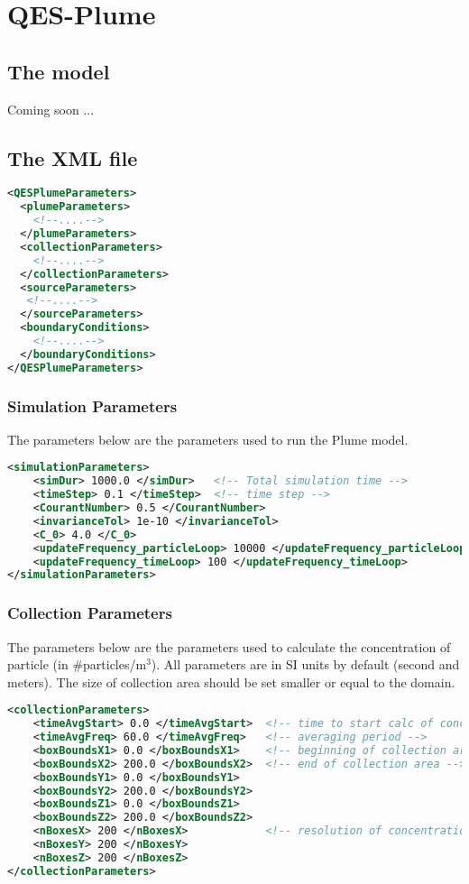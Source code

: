 \chapter{QES-Plume}

\section{The model}

Coming soon ...

\section{The XML file}

\begin{lstlisting}[language=XML]
<QESPlumeParameters>
  <plumeParameters>
    <!--....-->
  </plumeParameters>
  <collectionParameters>
    <!--....-->
  </collectionParameters>
  <sourceParameters>
   <!--....-->
  </sourceParameters>
  <boundaryConditions>
    <!--....-->
  </boundaryConditions>
</QESPlumeParameters>
\end{lstlisting}

\subsection{Simulation Parameters}

The parameters below are the parameters used to run the Plume model.

\begin{lstlisting}[language=XML]
<simulationParameters>
    <simDur> 1000.0 </simDur>   <!-- Total simulation time -->
    <timeStep> 0.1 </timeStep>  <!-- time step -->
    <CourantNumber> 0.5 </CourantNumber>
    <invarianceTol> 1e-10 </invarianceTol>
    <C_0> 4.0 </C_0>
    <updateFrequency_particleLoop> 10000 </updateFrequency_particleLoop>
    <updateFrequency_timeLoop> 100 </updateFrequency_timeLoop>
</simulationParameters>
\end{lstlisting}

\subsection{Collection Parameters}

The parameters below are the parameters used to calculate the concentration of particle (in \#particles/m$^{3}$). All parameters are in SI units by default (second and meters). The size of collection area should be set smaller or equal to the domain.
\begin{lstlisting}[language=XML]
<collectionParameters>
    <timeAvgStart> 0.0 </timeAvgStart>  <!-- time to start calc of concentration -->
    <timeAvgFreq> 60.0 </timeAvgFreq>   <!-- averaging period -->
    <boxBoundsX1> 0.0 </boxBoundsX1>    <!-- beginning of collection area -->
    <boxBoundsX2> 200.0 </boxBoundsX2>  <!-- end of collection area -->
    <boxBoundsY1> 0.0 </boxBoundsY1>
    <boxBoundsY2> 200.0 </boxBoundsY2>
    <boxBoundsZ1> 0.0 </boxBoundsZ1>
    <boxBoundsZ2> 200.0 </boxBoundsZ2>
    <nBoxesX> 200 </nBoxesX>            <!-- resolution of concentration -->
    <nBoxesY> 200 </nBoxesY>
    <nBoxesZ> 200 </nBoxesZ>
</collectionParameters>
\end{lstlisting}


